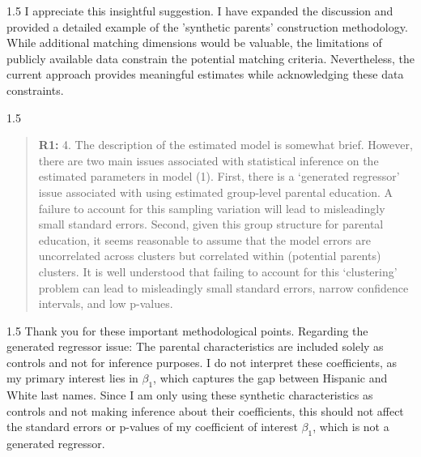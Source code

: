 \documentclass[12pt,english]{article}
\newcommand{\rrxspc}{1.5}
\begin{document}
\begin{refsection}
    \begin{spacing}{\rrxspc}
            I appreciate this insightful suggestion. I have expanded the discussion and provided a detailed example of the 'synthetic parents' construction methodology. While additional matching dimensions would be valuable, the limitations of publicly available data constrain the potential matching criteria. Nevertheless, the current approach provides meaningful estimates while acknowledging these data constraints.
    \end{spacing}
    
    \begin{spacing}{\rrxspc}
        \begin{quotation}
            \textbf{R1: } 4. The description of the estimated model is somewhat brief. However, there are two main issues associated with statistical inference on the estimated parameters in model (1). First, there is a ‘generated regressor’ issue associated with using estimated group-level parental education. A failure to account for this sampling variation will lead to misleadingly small standard errors. Second, given this group structure for parental education, it seems reasonable to assume that the model errors are uncorrelated across clusters but correlated within (potential parents) clusters. It is well understood that failing to account for this ‘clustering’ problem can lead to misleadingly small standard errors, narrow confidence intervals, and low p-values.
        \end{quotation}
    \end{spacing}

    \begin{spacing}{\rrxspc}
        Thank you for these important methodological points. Regarding the generated regressor issue: The parental characteristics are included solely as controls and not for inference purposes. I do not interpret these coefficients, as my primary interest lies in $\beta_1$, which captures the gap between Hispanic and White last names. Since I am only using these synthetic characteristics as controls and not making inference about their coefficients, this should not affect the standard errors or p-values of my coefficient of interest $\beta_1$, which is not a generated regressor.
    \end{spacing}


\end{refsection}
\end{document}
